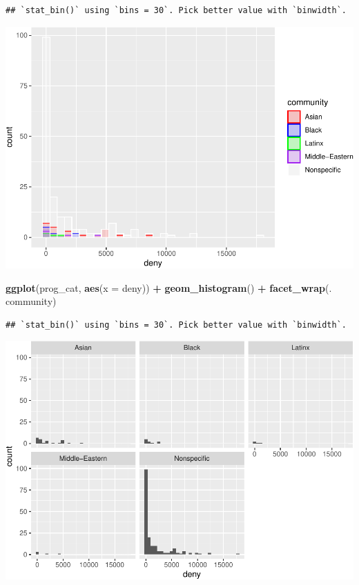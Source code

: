 \documentclass[]{article}
\newenvironment{Shaded}{\begin{snugshade}}{\end{snugshade}}
\newcommand{\DataTypeTok}[1]{\textcolor[rgb]{0.13,0.29,0.53}{#1}}
\newcommand{\KeywordTok}[1]{\textcolor[rgb]{0.13,0.29,0.53}{\textbf{#1}}}
\newcommand{\NormalTok}[1]{#1}
\newcommand{\OperatorTok}[1]{\textcolor[rgb]{0.81,0.36,0.00}{\textbf{#1}}}
\newcommand{\StringTok}[1]{\textcolor[rgb]{0.31,0.60,0.02}{#1}}
\begin{document}
\begin{verbatim}
## `stat_bin()` using `bins = 30`. Pick better value with `binwidth`.
\end{verbatim}

\includegraphics{sofc-funding_files/figure-latex/unnamed-chunk-7-3.pdf}

\begin{Shaded}
\begin{Highlighting}[]
\KeywordTok{ggplot}\NormalTok{(prog_cat, }\KeywordTok{aes}\NormalTok{(}\DataTypeTok{x =}\NormalTok{ deny)) }\OperatorTok{+}
\StringTok{  }\KeywordTok{geom_histogram}\NormalTok{() }\OperatorTok{+}
\StringTok{  }\KeywordTok{facet_wrap}\NormalTok{(. }\OperatorTok{~}\StringTok{ }\NormalTok{community)}
\end{Highlighting}
\end{Shaded}

\begin{verbatim}
## `stat_bin()` using `bins = 30`. Pick better value with `binwidth`.
\end{verbatim}

\includegraphics{sofc-funding_files/figure-latex/unnamed-chunk-7-4.pdf}
\end{document}
